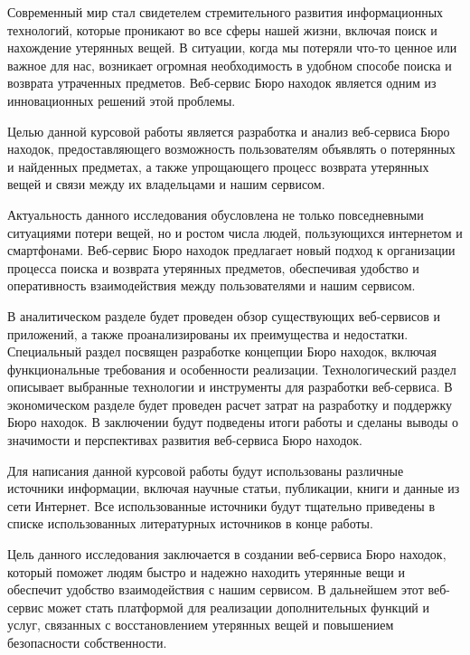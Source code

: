 \documentclass{mirea}
\begin{document}
	
% 
	
\addtocounter{page}{2}

\tableofcontents



Современный мир стал свидетелем стремительного развития информационных технологий, которые проникают во все сферы нашей жизни, включая поиск и нахождение утерянных вещей. В ситуации, когда мы потеряли что-то ценное или важное для нас, возникает огромная необходимость в удобном способе поиска и возврата утраченных предметов. Веб-сервис Бюро находок является одним из инновационных решений этой проблемы.

Целью данной курсовой работы является разработка и анализ веб-сер\-ви\-са Бюро находок, предоставляющего возможность пользователям объявлять о потерянных и найденных предметах, а также упрощающего процесс возврата утерянных вещей и связи между их владельцами и нашим сервисом.

Актуальность данного исследования обусловлена не только повседневными ситуациями потери вещей, но и ростом числа людей, пользующихся интернетом и смартфонами. Веб-сервис Бюро находок предлагает новый подход к организации процесса поиска и возврата утерянных предметов, обеспечивая удобство и оперативность взаимодействия между пользователями и нашим сервисом.

В аналитическом разделе будет проведен обзор существующих веб-сер\-ви\-сов и приложений, а также проанализированы их преимущества и недостатки. Специальный раздел посвящен разработке концепции Бюро находок, включая функциональные требования и особенности реализации. Технологический раздел описывает выбранные технологии и инструменты для разработки веб-сервиса. В экономическом разделе будет проведен расчет затрат на разработку и поддержку Бюро находок. В заключении будут подведены итоги работы и сделаны выводы о значимости и перспективах развития веб-сервиса Бюро находок.

Для написания данной курсовой работы будут использованы различные источники информации, включая научные статьи, публикации, книги и данные из сети Интернет. Все использованные источники будут тщательно приведены в списке использованных литературных источников в конце работы.

Цель данного исследования заключается в создании веб-сервиса Бюро находок, который поможет людям быстро и надежно находить утерянные вещи и обеспечит удобство взаимодействия с нашим сервисом. В дальнейшем этот веб-сервис может стать платформой для реализации дополнительных функций и услуг, связанных с восстановлением утерянных вещей и повышением безопасности собственности.
\end{document}
